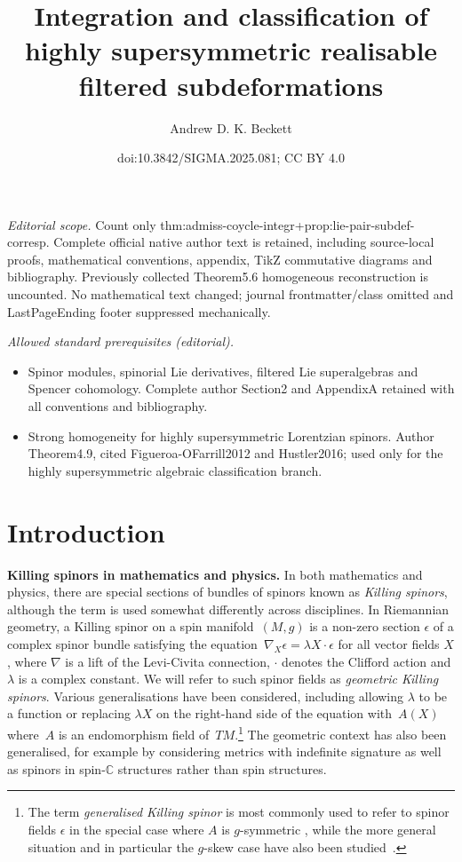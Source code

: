 \documentclass[10pt,a4paper]{amsart}
\title{Integration and classification of highly supersymmetric realisable filtered subdeformations}
\author{Andrew D. K. Beckett}
\date{doi:10.3842/SIGMA.2025.081; CC BY 4.0}
\numberwithin{equation}{section}
\newcommand{\1}{\mathbbm{1}}
\begin{document}
\maketitle
\noindent\textit{Editorial scope.} Count only thm:admiss-coycle-integr+prop:lie-pair-subdef-corresp. Complete official native author text is retained, including source-local proofs, mathematical conventions, appendix, TikZ commutative diagrams and bibliography. Previously collected Theorem5.6 homogeneous reconstruction is uncounted. No mathematical text changed; journal frontmatter/class omitted and LastPageEnding footer suppressed mechanically.\par\medskip
\noindent\textit{Allowed standard prerequisites (editorial).}\begin{itemize}
\item Spinor modules, spinorial Lie derivatives, filtered Lie superalgebras and Spencer cohomology. Complete author Section2 and AppendixA retained with all conventions and bibliography.
\item Strong homogeneity for highly supersymmetric Lorentzian spinors. Author Theorem4.9, cited Figueroa-OFarrill2012 and Hustler2016; used only for the highly supersymmetric algebraic classification branch.
\end{itemize}\medskip
\section{Introduction}
\label{sec:intro}

{\bf Killing spinors in mathematics and physics.}
In both mathematics and physics, there are special sections of bundles of spinors known as \emph{Killing spinors}, although the term is used somewhat differently across disciplines. In Riemannian geometry, a Killing spinor on a spin manifold~$(M,g)$ is a non-zero section $\epsilon$ of a complex spinor bundle satisfying the equation~${\nabla_{\!X} \epsilon = \lambda X\!\cdot \epsilon
}$
for all vector fields $X$, where $\nabla$ is a lift of the Levi-Civita connection, $\cdot$ denotes the Clifford action and $\lambda$ is a complex constant. We will refer to such spinor fields as \emph{geometric Killing spinors}. Various generalisations have been considered, including allowing $\lambda$ to be a function \cite{Lichnerowicz1987} or replacing $\lambda X$ on the right-hand side of the equation with~$A(X)$ where~$A$ is an endomorphism field of~$TM$.\footnote{The term \emph{generalised Killing spinor} is most commonly used to refer to spinor fields $\epsilon$ in the special case where $A$ is $g$-symmetric \cite{Bar2005,Moroianu2014}, while the more general situation and in particular the $g$-skew case have also been studied~\cite{Habib2012}.}
The geometric context has also been generalised, for example by considering metrics with indefinite signature \cite{Bohle2003} as well as spinors in spin-$\mathbb{C}$ structures \cite{Moroianu1997} rather than spin structures.
\end{document}
